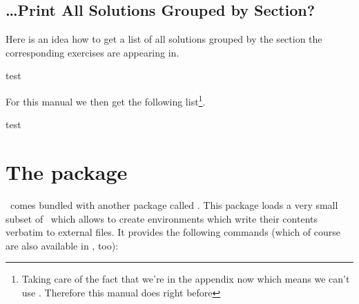 \documentclass{xsim-manual}
\begin{document}
\subsection{\dots Print All Solutions Grouped by Section?}
Here is an idea how to get a list of all solutions grouped by the section the
corresponding exercises are appearing in.
\begin{sourcecode}

  \setcounter{sections}{1}
  \whileboolexpr
    { test {} }
    {
      \printsolutions[section=\value{sections},headings-template=per-section]
    }
\end{sourcecode}
For this manual we then get the following list\footnote{Taking care of the
  fact that we're in the appendix now which means we can't use
  .  Therefore this manual does
   right before
  }.

\setcounter{sections}{1}
\whileboolexpr
  { test {} }
  {
    \printsolutions[section=\value{sections},headings-template=per-section]
  }
    
\section{The  package}\label{sec:xsimverb-package}
\xsim\ comes bundled with another package called .  This package
loads a very small subset of \xsim\ which allows to create environments which
write their contents verbatim to external files.  It provides the following
commands (which of course are also available in \xsim, too):
\end{document}
